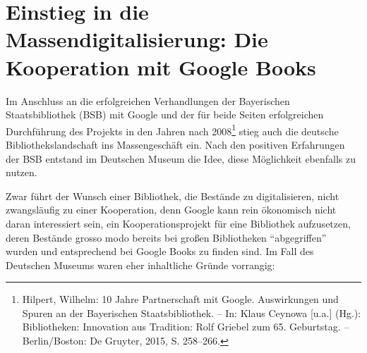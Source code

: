 \documentclass[a4paper,
fontsize=11pt,
oneside,
numbers=noperiodatend,
parskip=half-,
bibliography=totoc,
final
]{scrartcl}
\begin{document}
\hypertarget{einstieg-in-die-massendigitalisierung-die-kooperation-mit-google-books}{%
\section{Einstieg in die Massendigitalisierung: Die Kooperation
mit Google
Books}\label{einstieg-in-die-massendigitalisierung-die-kooperation-mit-google-books}}

Im Anschluss an die erfolgreichen Verhandlungen der Bayerischen
Staatsbibliothek (BSB) mit Google und der für beide Seiten erfolgreichen
Durchführung des Projekts in den Jahren nach 2008\footnote{Hilpert,
  Wilhelm: 10 Jahre Partnerschaft mit Google. Auswirkungen und Spuren an
  der Bayerischen Staatsbibliothek. -- In: Klaus Ceynowa {[}u.a.{]}
  (Hg.): Bibliotheken: Innovation aus Tradition: Rolf Griebel zum 65.
  Geburtstag. -- Berlin/Boston: De Gruyter, 2015, S. 258--266.} stieg
auch die deutsche Bibliothekslandschaft ins Massengeschäft ein. Nach den
positiven Erfahrungen der BSB entstand im Deutschen Museum die Idee,
diese Möglichkeit ebenfalls zu nutzen.

Zwar führt der Wunsch einer Bibliothek, die Bestände zu digitalisieren,
nicht zwangsläufig zu einer Kooperation, denn Google kann rein
ökonomisch nicht daran interessiert sein, ein Kooperationsprojekt für
eine Bibliothek aufzusetzen, deren Bestände grosso modo bereits bei
großen Bibliotheken \enquote{abgegriffen} wurden und entsprechend bei
Google Books zu finden sind. Im Fall des Deutschen Museums waren eher
inhaltliche Gründe vorrangig:
\end{document}

